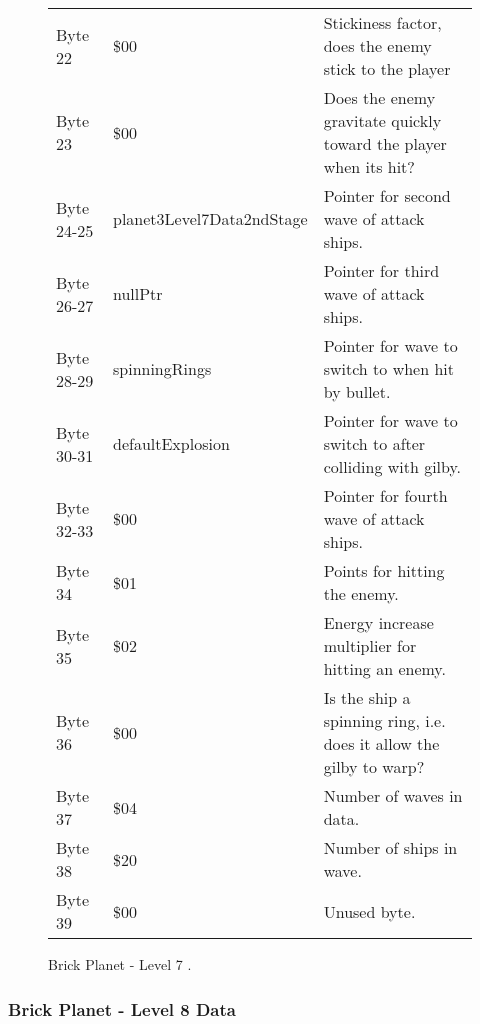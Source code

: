\begin{figure}[H]
{\begin{adjustbox}{width=12cm}
\begin{tabular}{lll}
 Byte 22    & \$00                       & Stickiness factor, does the enemy stick to the player               \\
 Byte 23    & \$00                       & Does the enemy gravitate quickly toward the player when its hit?    \\
 Byte 24-25 & planet3Level7Data2ndStage & Pointer for second wave of attack ships.                            \\
 Byte 26-27 & nullPtr                   & Pointer for third wave of attack ships.                             \\
 Byte 28-29 & spinningRings             & Pointer for wave to switch to when hit by bullet.                   \\
 Byte 30-31 & defaultExplosion          & Pointer for  wave to switch to after colliding with gilby.          \\
 Byte 32-33 & \$00                       & Pointer for fourth wave of attack ships.                            \\
 Byte 34    & \$01                       & Points for hitting the enemy.                                       \\
 Byte 35    & \$02                       & Energy increase multiplier for hitting an enemy.                    \\
 Byte 36    & \$00                       & Is the ship a spinning ring, i.e. does it allow the gilby to warp?  \\
 Byte 37    & \$04                       & Number of waves in data.                                            \\
 Byte 38    & \$20                       & Number of ships in wave.                                            \\
 Byte 39    & \$00                       & Unused byte.                                                        \\
\bottomrule
\end{tabular}

  \end{adjustbox}

  }\caption*{Brick Planet - Level 7
.}
\end{figure}

\clearpage
\subsubsection{Brick Planet - Level 8 Data}

